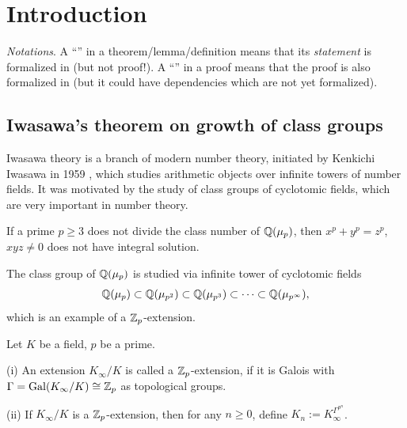 %

\tableofcontents

\section{Introduction}

\emph{Notations}.
A ``{\checkmark}'' in a theorem/lemma/definition means that its \emph{statement}
is formalized in {\Lean} (but not proof!). A ``{\checkmark}'' in a proof means that
the proof is also formalized in {\Lean} (but it could have dependencies which
are not yet formalized).

\subsection{Iwasawa's theorem on growth of class groups}

Iwasawa theory is a branch of modern number theory,
initiated by Kenkichi Iwasawa in 1959 \cite{Iwa59},
which studies arithmetic objects
over infinite towers of number fields.
It was motivated by the study of
class groups of cyclotomic fields, which are very important in number theory.

\begin{thm}
\label{flt-regular}
If a prime $p\geq 3$ does not divide the class number of ${\mathbb {Q}}(\mu_p)$, then
$x^p+y^p=z^p$, $xyz\neq 0$ does not have integral solution.
\end{thm}

The class group of ${\mathbb {Q}}(\mu_p)$ is studied via
infinite tower of cyclotomic fields
$$
{\mathbb {Q}}(\mu_p)\subset{\mathbb {Q}}(\mu_{p^2})\subset{\mathbb {Q}}(\mu_{p^3})\subset\cdots
\subset{\mathbb {Q}}(\mu_{p^\infty}),
$$
which is an example of a ${\mathbb {Z}}_p$-extension.

\begin{definition}
\label{Zp-ext-def}
\leanok
Let $K$ be a field, $p$ be a prime.

{\rm(i)} An extension $K_\infty/K$ is called a ${\mathbb {Z}}_p$-extension,
if it is Galois with $\Gamma={\mathrm{Gal}}(K_\infty/K)\cong{\mathbb {Z}}_p$
as topological groups.

{\rm(ii)} If $K_\infty/K$ is a ${\mathbb {Z}}_p$-extension, then for any
$n\geq 0$, define $K_n:=K_\infty^{\Gamma^{p^n}}$.
\end{definition}


